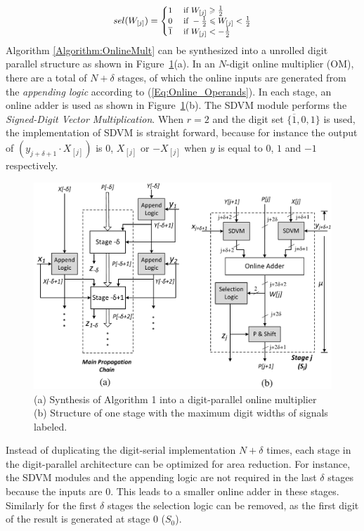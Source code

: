 \documentclass{acm_proc_article-sp}
\begin{document}
\vspace{-2ex}
\begin{eqnarray}\label{Eq:SelFunc_OM}
\small
  sel(W_{[j]})=\begin{cases}
    1 & \text{ if } W_{[j]} \geqslant \frac{1}{2} \\
    0 & \text{ if } -\frac{1}{2}\leqslant W_{[j]}<\frac{1}{2} \\
    \overline{1} & \text{ if } W_{[j]}<-\frac{1}{2}
  \end{cases}
\normalsize
\end{eqnarray}
%
Algorithm \ref{Algorithm:OnlineMult} can be synthesized into a unrolled digit parallel structure as shown in  Figure~\ref{Fig:Radix2OnlineMultiplier}(a). In an $N$-digit online multiplier (OM), there are a total of $N+\delta$ stages, of which the online inputs are generated from the \emph{appending logic} according to (\ref{Eq:Online_Operands}). In each stage, an online adder is used as shown in Figure~\ref{Fig:Radix2OnlineMultiplier}(b). The SDVM module performs the \emph{Signed-Digit Vector Multiplication}. When $r=2$ and the digit set $\{\overline{1},0,1\}$ is used, the implementation of SDVM is straight forward, because for instance the output of $(y_{j+\delta+1}\cdot X_{[j]})$ is 0, $X_{[j]}$ or $-X_{[j]}$ when $y$ is equal to $0$, $1$ and $-1$ respectively.\vspace{-1ex}

\begin{figure}[tbp]
\centering
\includegraphics[width=.49\textwidth]{./Figures/OnlineMult_Unrolled.pdf}
\vspace{-4ex}
\caption{(a) Synthesis of Algorithm 1 into a digit-parallel online multiplier (b) Structure of one stage with the maximum digit widths of signals labeled.}
\vspace{-2ex}
\label{Fig:Radix2OnlineMultiplier}
\end{figure}

Instead of duplicating the digit-serial implementation $N+\delta$ times, each stage in the digit-parallel architecture can be optimized for area reduction. For instance, the SDVM modules and the appending logic are not required in the last $\delta$ stages because the inputs are 0. This leads to a smaller online adder in these stages. Similarly for the first $\delta$ stages the selection logic can be removed, as the first digit of the result is generated at stage 0 ($S_0$).
\end{document}
